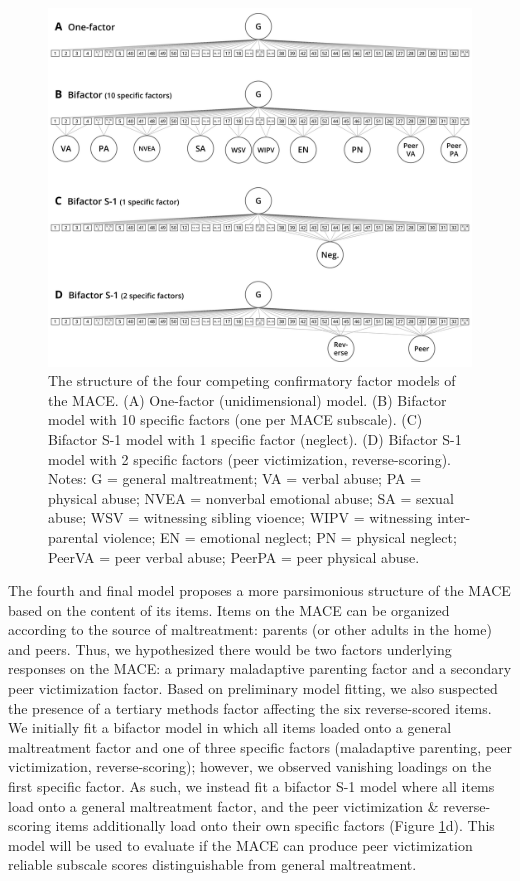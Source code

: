\documentclass[letterpaper,man,natbib,noextraspace,floatsintext,longtable]{apa6}
\begin{document}
\begin{figure}[t!]
    \centering
    \includegraphics[width=1.1\textwidth,center]{figures/fig01.png}
    \captionsetup{width=1.1\textwidth}
    \caption{\normalfont The structure of the four competing confirmatory factor models of the MACE. (A) One-factor (unidimensional) model. (B) Bifactor model with 10 specific factors (one per MACE subscale). (C) Bifactor S-1 model with 1 specific factor (neglect). (D) Bifactor S-1 model with 2 specific factors (peer victimization, reverse-scoring). Notes: G = general maltreatment; VA = verbal abuse; PA = physical abuse; NVEA = nonverbal emotional abuse; SA = sexual abuse; WSV = witnessing sibling vioence; WIPV = witnessing inter-parental violence; EN = emotional neglect; PN = physical neglect; PeerVA = peer verbal abuse; PeerPA = peer physical abuse.}
    \label{fig:models}
\end{figure}

The fourth and final model proposes a more parsimonious structure of the MACE based on the content of its items. Items on the MACE can be organized according to the source of maltreatment: parents (or other adults in the home) and peers. Thus, we hypothesized there would be two factors underlying responses on the MACE: a primary maladaptive parenting factor and a secondary peer victimization factor. Based on preliminary model fitting, we also suspected the presence of a tertiary methods factor affecting the six reverse-scored items. We initially fit a bifactor model in which all items loaded onto a general maltreatment factor and one of three specific factors (maladaptive parenting, peer victimization, reverse-scoring); however, we observed vanishing loadings on the first specific factor. As such, we instead fit a bifactor S-1 model where all items load onto a general maltreatment factor, and the peer victimization \& reverse-scoring items additionally load onto their own specific factors (Figure \ref{fig:models}d). This model will be used to evaluate if the MACE can produce peer victimization reliable subscale scores distinguishable from general maltreatment. 
\end{document}
